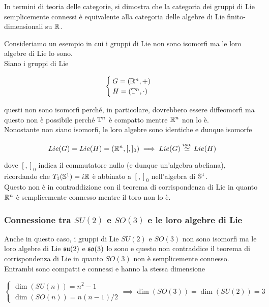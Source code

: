 \begin{remark}
	In termini di teoria delle categorie, si dimostra che la categoria dei gruppi di Lie semplicemente connessi è equivalente alla categoria delle algebre di Lie finito-dimensionali su $ \R $.
\end{remark}

Consideriamo un esempio in cui i gruppi di Lie non sono isomorfi ma le loro algebre di Lie lo sono.\\
Siano i gruppi di Lie

\begin{equation}
	\begin{cases}
		G = (\R^{n},+) \\
		H = (\T^{n},\cdot)
	\end{cases}
\end{equation}

questi non sono isomorfi perché, in particolare, dovrebbero essere diffeomorfi ma questo non è possibile perché $ \T^{n} $ è compatto mentre $ \R^{n} $ non lo è.\\
Nonostante non siano isomorfi, le loro algebre sono identiche e dunque isomorfe

\begin{equation}
	Lie(G) = Lie(H) = (\R^{n},[,]_{0}) %
	\implies %
	Lie(G) \stackrel{iso.}{\simeq} Lie(H)
\end{equation}

dove $ [,]_{0} $ indica il commutatore nullo (e dunque un'algebra abeliana), ricordando che $ T_{1}(\S^{1}) = i \R $ è abbinato a $ [,]_{0} $ nell'algebra di $ \S^{1} $.\\
Questo non è in contraddizione con il teorema di corrispondenza di Lie in quanto $ \R^{n} $ è semplicemente connesso mentre il toro non lo è.

\subsubsection{Connessione tra $ SU(2) $ e $ SO(3) $ e le loro algebre di Lie}

Anche in questo caso, i gruppi di Lie $ SU(2) $ e $ SO(3) $ non sono isomorfi ma le loro algebre di Lie $ \su(2) $ e $ \so(3) $ lo sono e questo non contraddice il teorema di corrispondenza di Lie in quanto $ SO(3) $ non è semplicemente connesso.\\
Entrambi sono compatti e connessi e hanno la stessa dimensione

\begin{equation}
	\begin{cases}
		\dim(SU(n)) = n^{2} - 1 \\
		\dim(SO(n)) = n(n-1)/2
	\end{cases}
	\implies %
	\dim(SO(3)) = \dim(SU(2)) = 3
\end{equation}

